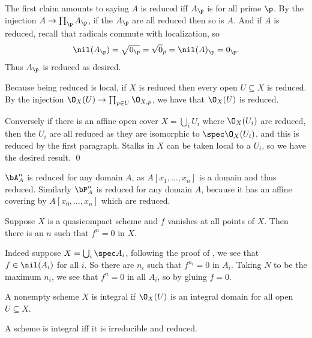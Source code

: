 \eprop

\bproof

    The first claim amounts to saying $A$ is reduced iff $A_\p$ is for all prime $\p$.
    By the injection $A\to\prod_\p A_\p$, if the $A_\p$ are all reduced then so is $A$.
    And if $A$ is reduced, recall that radicals commute with localization, so
    $$ \nil(A_\p) = \sqrt{0_\p} = \sqrt 0_p = \nil(A)_\p = 0_\p . $$
    Thus $A_\p$ is reduced as desired.

    Because being reduced is local, if $X$ is reduced then every open $U\subseteq X$ is reduced.
    By the injection $\O_X(U)\to\prod_{p\in U}\O_{X,p}$, we have that $\O_X(U)$ is reduced.

    Conversely if there is an affine open cover $X=\bigcup_iU_i$ where $\O_X(U_i)$ are reduced, then the $U_i$ are all reduced as they are isomorphic to
    $\spec\O_X(U_i)$, and this is reduced by the first paragraph.
    Stalks in $X$ can be taken local to a $U_i$, so we have the desired result.
    \qed

\eproof

\bexam

    $\bA^n_A$ is reduced for any domain $A$, as $A[x_1,\dots,x_n]$ is a domain and thus reduced.
    Similarly $\bP^n_A$ is reduced for any domain $A$, because it has an affine covering by $A[x_0,\dots,x_n]$ which are reduced.

\eexam

\bremark

    Suppose $X$ is a quasicompact scheme and $f$ vanishes at all points of $X$.
    Then there is an $n$ such that $f^n=0$ in $X$.

    Indeed suppose $X=\bigcup_i\spec A_i$, following the proof of , we see that $f\in\nil(A_i)$ for all $i$.
    So there are $n_i$ such that $f^{n_i}=0$ in $A_i$.
    Taking $N$ to be the maximum $n_i$, we see that $f^n=0$ in all $A_i$, so by gluing $f=0$.

\eremark

\bdefn

    A nonempty scheme $X$ is {\emphcolor integral} if $\O_X(U)$ is an integral domain for all open $U\subseteq X$.

\edefn

\bprop[name={intschemecond}]

    A scheme is integral iff it is irreducible and reduced.

\eprop

\bproof

